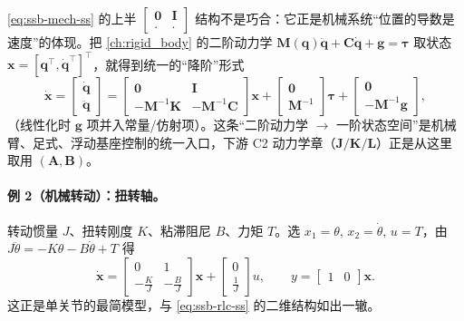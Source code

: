 \begin{insight}
\cref{eq:ssb-mech-ss} 的上半 $\begin{bmatrix}\mathbf{0}&\mathbf{I}\\ \cdot&\cdot\end{bmatrix}$ 结构不是巧合：它正是机械系统“位置的导数是速度”的体现。把 \cref{ch:rigid_body} 的二阶动力学 $\mathbf{M}(\mathbf{q})\ddot{\mathbf{q}}+\mathbf{C}\dot{\mathbf{q}}+\mathbf{g}=\boldsymbol{\tau}$ 取状态 $\mathbf{x}=[\mathbf{q}^\top,\dot{\mathbf{q}}^\top]^\top$，就得到统一的“降阶”形式
\begin{equation}
  \dot{\mathbf{x}}=\begin{bmatrix}\dot{\mathbf{q}}\\\ddot{\mathbf{q}}\end{bmatrix}
  =\begin{bmatrix}\mathbf{0}&\mathbf{I}\\ -\mathbf{M}^{-1}\mathbf{K}&-\mathbf{M}^{-1}\mathbf{C}\end{bmatrix}\mathbf{x}
  +\begin{bmatrix}\mathbf{0}\\\mathbf{M}^{-1}\end{bmatrix}\boldsymbol{\tau}
  +\begin{bmatrix}\mathbf{0}\\-\mathbf{M}^{-1}\mathbf{g}\end{bmatrix},
  \label{eq:ssb-mechanical-general}
\end{equation}
（线性化时 $\mathbf{g}$ 项并入常量/仿射项）。这条“二阶动力学 $\to$ 一阶状态空间”是机械臂、足式、浮动基座控制的统一入口，下游 C2 动力学章（$\mathbf{J}/\mathbf{K}/\mathbf{L}$）正是从这里取用 $(\mathbf{A},\mathbf{B})$。
\end{insight}

\paragraph{例 2（机械转动）：扭转轴。}
转动惯量 $J$、扭转刚度 $K$、粘滞阻尼 $B$、力矩 $T$。选 $x_1=\theta,\,x_2=\dot\theta,\,u=T$，由 $J\ddot\theta=-K\theta-B\dot\theta+T$ 得
\begin{equation}
  \dot{\mathbf{x}}=\begin{bmatrix}0&1\\-\tfrac{K}{J}&-\tfrac{B}{J}\end{bmatrix}\mathbf{x}+\begin{bmatrix}0\\\tfrac{1}{J}\end{bmatrix}u,
  \qquad y=\begin{bmatrix}1&0\end{bmatrix}\mathbf{x}.
  \label{eq:ssb-rot-ss}
\end{equation}
这正是单关节的最简模型，与 \cref{eq:ssb-rlc-ss} 的二维结构如出一辙。

